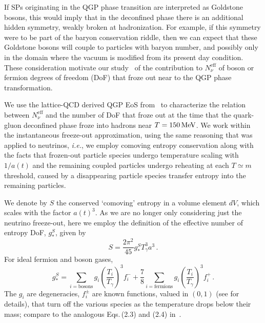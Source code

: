 If SPs originating in the QGP phase transition are interpreted as Goldstone bosons, this would imply that in the deconfined phase there is an additional hidden symmetry, weakly broken at hadronization. For example, if this symmetry were to be part of the baryon conservation riddle, then we can expect that these Goldstone bosons will couple to particles with baryon number, and possibly only in the domain where the vacuum is modified from its present day condition. These consideration motivate our study~\cite{Birrell:2014cja} of the contribution to 
$N^{\text{eff}}_{\nu}$ of boson or fermion degrees of freedom (DoF) that froze out near to the QGP phase transformation. 

We use the lattice-QCD derived QGP EoS from~\cite{Borsanyi:2013bia} to characterize the relation between $N^{\text{eff}}_{\nu}$ and the number of DoF that froze out at the time that the quark-gluon deconfined phase froze into hadrons near $T=150\text{\,MeV}$. We work within the instantaneous freeze-out approximation, using the same reasoning that was applied to neutrinos, {\it i.e.\/}, we employ comoving entropy conservation along with the facts that frozen-out particle species undergo temperature scaling with $1/a(t)$ and the remaining coupled particles undergo reheating at each $T\simeq m$ threshold, caused by a disappearing particle species transfer entropy into the remaining particles.

We denote by $S$ the conserved `comoving' entropy in a volume element $dV$, which scales with the factor $a(t)^3$. As we are no longer only considering just the neutrino freeze-out, here we employ the definition of the effective number of entropy DoF, $g_*^S$, given by
\begin{equation}
S=\frac{2\pi^2}{45}g^S_*T_\gamma^3 a^3\,.
\end{equation} 
For ideal fermion and boson gases, 
\begin{equation}
g_*^S=\!\!\!\!\sum_{i=\text{bosons}}\!\!\!\!g_i \left(\frac{T_i}{T_\gamma}\right)^3\!\!\!f_i^-+\frac{7}{8}\!\!\!\sum_{i=\text{fermions}}\!\!\!\! g_i \left(\frac{T_i}{T_\gamma}\right)^3\!\!\!f_i^+\,.
\end{equation}
The $g_i$ are degeneracies, $f_i^\pm$ are known functions, valued in $(0,1)$ (see  for details), that turn off the various species as the temperature drops below their mass; compare to the analogous Eqs.\,(2.3) and (2.4) in~\cite{Blennow:2012de}. 

